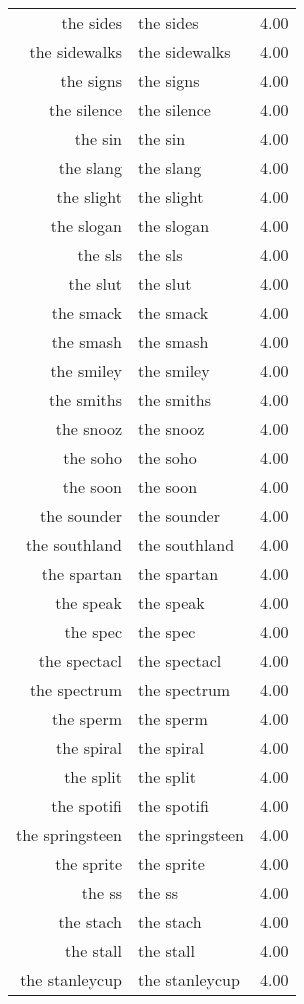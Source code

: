 \begin{table}[ht]
\begin{tabular}{rlr}
  the sides & the sides & 4.00 \\ 
  the sidewalks & the sidewalks & 4.00 \\ 
  the signs & the signs & 4.00 \\ 
  the silence & the silence & 4.00 \\ 
  the sin & the sin & 4.00 \\ 
  the slang & the slang & 4.00 \\ 
  the slight & the slight & 4.00 \\ 
  the slogan & the slogan & 4.00 \\ 
  the sls & the sls & 4.00 \\ 
  the slut & the slut & 4.00 \\ 
  the smack & the smack & 4.00 \\ 
  the smash & the smash & 4.00 \\ 
  the smiley & the smiley & 4.00 \\ 
  the smiths & the smiths & 4.00 \\ 
  the snooz & the snooz & 4.00 \\ 
  the soho & the soho & 4.00 \\ 
  the soon & the soon & 4.00 \\ 
  the sounder & the sounder & 4.00 \\ 
  the southland & the southland & 4.00 \\ 
  the spartan & the spartan & 4.00 \\ 
  the speak & the speak & 4.00 \\ 
  the spec & the spec & 4.00 \\ 
  the spectacl & the spectacl & 4.00 \\ 
  the spectrum & the spectrum & 4.00 \\ 
  the sperm & the sperm & 4.00 \\ 
  the spiral & the spiral & 4.00 \\ 
  the split & the split & 4.00 \\ 
  the spotifi & the spotifi & 4.00 \\ 
  the springsteen & the springsteen & 4.00 \\ 
  the sprite & the sprite & 4.00 \\ 
  the ss & the ss & 4.00 \\ 
  the stach & the stach & 4.00 \\ 
  the stall & the stall & 4.00 \\ 
  the stanleycup & the stanleycup & 4.00 \\ 

\end{tabular}
\end{table}
